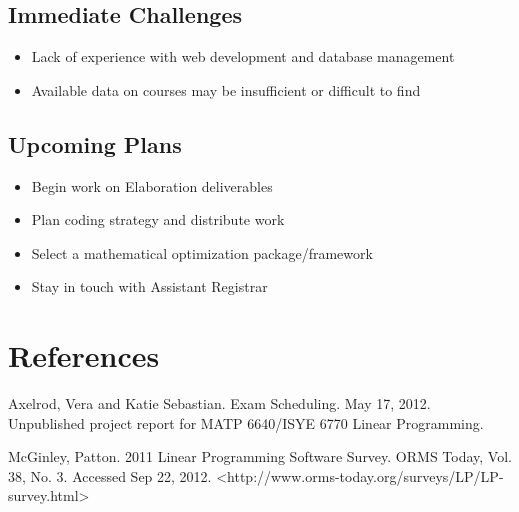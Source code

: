 \documentclass[11pt]{article}
\begin{document}
\subsection{Immediate Challenges} %
\begin{itemize}
\item Lack of experience with web development and database management
\item Available data on courses may be insufficient or difficult to find
\end{itemize}

\subsection{Upcoming Plans}
\begin{itemize}
\item Begin work on Elaboration deliverables
\item Plan coding strategy and distribute work
\item Select a mathematical optimization package/framework
\item Stay in touch with Assistant Registrar
\end{itemize}

\section*{References}

\hspace{0.25in}Axelrod, Vera and Katie Sebastian. Exam Scheduling. May 17, 2012. Unpublished project report for MATP 6640/ISYE 6770 Linear Programming.

McGinley,  Patton. 2011 Linear Programming Software Survey. ORMS Today, Vol. 38, No. 3.  Accessed Sep 22, 2012. <http://www.orms-today.org/surveys/LP/LP-survey.html>
\end{document}
